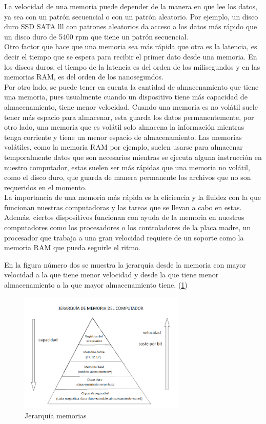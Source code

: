 \documentclass{article}
\begin{document}
La velocidad de una memoria puede depender de la manera en que lee los datos, ya sea con un patrón secuencial o con un patrón aleatorio. Por ejemplo, un disco duro SSD SATA lll con patrones aleatorios da acceso a los datos más rápido que un disco duro de 5400 rpm que tiene un patrón secuencial.\\
Otro factor que hace que una memoria sea más rápida que otra es la latencia, es decir el tiempo que se espera para recibir el primer dato desde una memoria. En los discos duros, el tiempo de la latencia es del orden de los milisegundos y en las memorias RAM, es del orden de los nanosegundos.\\
Por otro lado, se puede tener en cuenta la cantidad de almacenamiento que tiene una memoria, pues usualmente cuando un dispositivo tiene más capacidad de almacenamiento, tiene menor velocidad. Cuando una memoria es no volátil suele tener más espacio para almacenar, esta guarda los datos permanentemente, por otro lado, una memoria que es volátil solo almacena la información mientras tenga corriente y tiene un menor espacio de almacenamiento. Las memorias volátiles, como la memoria RAM por ejemplo, suelen usarse para almacenar temporalmente datos que son necesarios mientras se ejecuta alguna instrucción en nuestro computador, estas suelen ser más rápidas que una memoria no volátil, como el disco duro, que guarda de manera permanente los archivos que no son requeridos en el momento.\\
La importancia de una memoria más rápida es la eficiencia y la fluidez con la que funcionan nuestras computadoras y las tareas que se llevan a cabo en estas. Además, ciertos dispositivos funcionan con ayuda de la memoria en nuestros computadores como los procesadores o  los controladores de la placa madre, un procesador que trabaja a una gran velocidad requiere de un soporte como la memoria RAM que pueda seguirle el ritmo\cite{Alelua}.


En la figura número dos se muestra la jerarquía desde la memoria con mayor velocidad a la que tiene menor velocidad y desde la que tiene menor almacenamiento a la que mayor almacenamiento tiene. (\ref{fig:jerarquia})

\begin{figure}[h]
\includegraphics[width=8cm]{jerarquia.png}
\centering
\caption{Jerarquía memorias}
\label{fig:jerarquia}
\end{figure}
\end{document}
